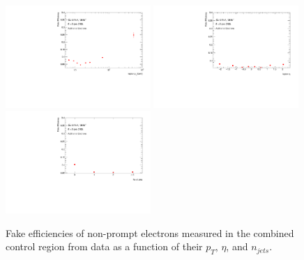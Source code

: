 \begin{figure}[!htbp]
        \begin{center}
        \includegraphics[width = 0.49\textwidth]{figures/Analysis/Background/Fake_Eff_Elec_pt_1D.pdf}
        \includegraphics[width = 0.49\textwidth]{figures/Analysis/Background/Fake_Eff_Elec_eta_1D.pdf}\\
        \includegraphics[width = 0.49\textwidth]{figures/Analysis/Background/Fake_Eff_Elec_jet_n_1D.pdf} 
        \end{center}
    \caption{Fake efficiencies of non-prompt electrons measured in the combined control region from data as a function of their $p_{T}$, $\eta$, and $n_{jets}$.\label{fig:FakeEff_1D_Electron}}
\end{figure}

